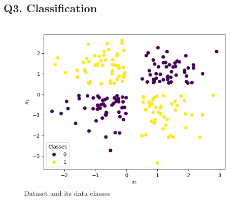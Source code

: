 \documentclass[tikz,14pt,fleqn]{article}
\begin{document}
\subsection{Q3. Classification}
\begin{figure}[h!]
    \centering
    \vspace*{-0.5cm}
    \includegraphics[width=0.7\linewidth]{fig/clustering.png}
    \vspace*{-0.3cm}
    \caption{Dataset and its data classes}
    \vspace*{-0.3cm}
    \label{fig:q3}
\end{figure}
\end{document}
